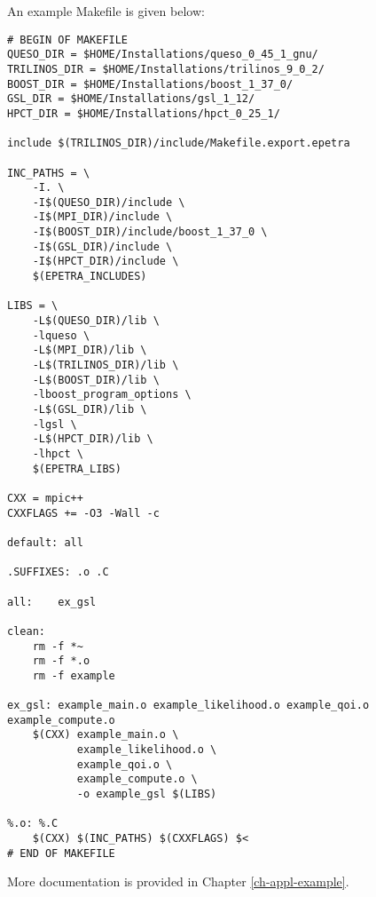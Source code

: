 An example Makefile is given below:
\begin{verbatim}
# BEGIN OF MAKEFILE
QUESO_DIR = $HOME/Installations/queso_0_45_1_gnu/
TRILINOS_DIR = $HOME/Installations/trilinos_9_0_2/
BOOST_DIR = $HOME/Installations/boost_1_37_0/
GSL_DIR = $HOME/Installations/gsl_1_12/
HPCT_DIR = $HOME/Installations/hpct_0_25_1/

include $(TRILINOS_DIR)/include/Makefile.export.epetra

INC_PATHS = \
	-I. \
	-I$(QUESO_DIR)/include \
	-I$(MPI_DIR)/include \
	-I$(BOOST_DIR)/include/boost_1_37_0 \
	-I$(GSL_DIR)/include \
	-I$(HPCT_DIR)/include \
	$(EPETRA_INCLUDES)

LIBS = \
	-L$(QUESO_DIR)/lib \
	-lqueso \
	-L$(MPI_DIR)/lib \
	-L$(TRILINOS_DIR)/lib \
	-L$(BOOST_DIR)/lib \
	-lboost_program_options \
	-L$(GSL_DIR)/lib \
	-lgsl \
	-L$(HPCT_DIR)/lib \
	-lhpct \
	$(EPETRA_LIBS)

CXX = mpic++
CXXFLAGS += -O3 -Wall -c

default: all

.SUFFIXES: .o .C

all:	ex_gsl

clean:
	rm -f *~
	rm -f *.o
	rm -f example

ex_gsl: example_main.o example_likelihood.o example_qoi.o example_compute.o
	$(CXX) example_main.o \
	       example_likelihood.o \
	       example_qoi.o \
	       example_compute.o \
	       -o example_gsl $(LIBS)

%.o: %.C
	$(CXX) $(INC_PATHS) $(CXXFLAGS) $<
# END OF MAKEFILE
\end{verbatim}

More documentation is provided in Chapter \ref{ch-appl-example}.
